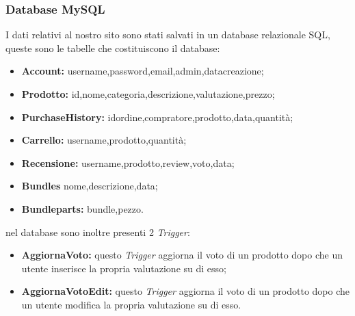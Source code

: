 \subsubsection{Database MySQL}
I dati relativi al nostro sito sono stati salvati in un database relazionale SQL, queste sono le tabelle che costituiscono il database:
\begin{itemize}
    \item \textbf{Account:} username,password,email,admin,datacreazione;
    \item \textbf{Prodotto:} id,nome,categoria,descrizione,valutazione,prezzo;
    \item \textbf{PurchaseHistory:} idordine,compratore,prodotto,data,quantità;
    \item \textbf{Carrello:} username,prodotto,quantità;
    \item \textbf{Recensione:} username,prodotto,review,voto,data;
    \item \textbf{Bundles} nome,descrizione,data;
    \item \textbf{Bundleparts:} bundle,pezzo.	
\end{itemize}
nel database sono inoltre presenti 2 \emph{Trigger}:
\begin{itemize}
	\item \textbf{AggiornaVoto:} questo \emph{Trigger} aggiorna il voto di un prodotto dopo che un utente inserisce la propria valutazione su di esso;
	\item \textbf{AggiornaVotoEdit:} questo \emph{Trigger} aggiorna il voto di un prodotto dopo che un utente modifica la propria valutazione su di esso.
\end{itemize}
